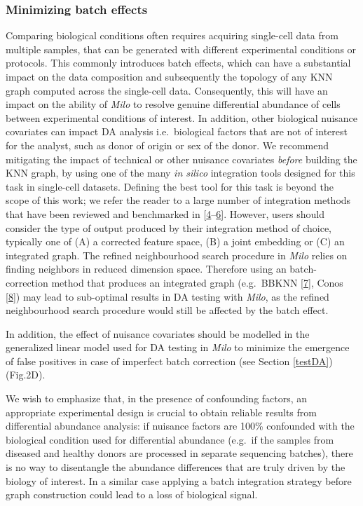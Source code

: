 \documentclass[
]{article}
\begin{document}
\hypertarget{minimizing-batch-effects}{%
\subsubsection{Minimizing batch effects}\label{minimizing-batch-effects}}

Comparing biological conditions often requires acquiring single-cell data from multiple samples, that can be generated with different experimental conditions or protocols. This commonly introduces batch effects, which can have a substantial impact on the data composition and subsequently the topology of any KNN graph computed across the single-cell data. Consequently, this will have an impact on the ability of \emph{Milo} to resolve genuine differential abundance of cells between experimental conditions of interest. In addition, other biological nuisance covariates can impact DA analysis i.e.~biological factors that are not of interest for the analyst, such as donor of origin or sex of the donor. We recommend mitigating the impact of technical or other nuisance covariates \emph{before} building the KNN graph, by using one of the many \emph{in silico} integration tools designed for this task in single-cell datasets.
Defining the best tool for this task is beyond the scope of this work; we refer the reader to a large number of integration methods that have been reviewed and benchmarked in {[}\protect\hyperlink{ref-lueckenBenchmarkingAtlaslevelData2020}{4}--\protect\hyperlink{ref-tranBenchmarkBatcheffectCorrection2020}{6}{]}. However, users should consider the type of output produced by their integration method of choice, typically one of (A) a corrected feature space, (B) a joint embedding or (C) an integrated graph. The refined neighbourhood search procedure in \emph{Milo} relies on finding neighbors in reduced dimension space. Therefore using an batch-correction method that produces an integrated graph (e.g.~BBKNN {[}\protect\hyperlink{ref-polanskiBBKNNFastBatch}{7}{]}, Conos {[}\protect\hyperlink{ref-barkasJointAnalysisHeterogeneous2019}{8}{]}) may lead to sub-optimal results in DA testing with \emph{Milo}, as the refined neighbourhood search procedure would still be affected by the batch effect.

In addition, the effect of nuisance covariates should be modelled in the generalized linear model used for DA testing in \emph{Milo} to minimize the emergence of false positives in case of imperfect batch correction (see Section \ref{testDA}) (Fig.2D).

We wish to emphasize that, in the presence of confounding factors, an appropriate experimental design is crucial to obtain reliable results from differential abundance analysis: if nuisance factors are 100\% confounded with the biological condition used for differential abundance (e.g.~if the samples from diseased and healthy donors are processed in separate sequencing batches), there is no way to disentangle the abundance differences that are truly driven by the biology of interest. In a similar case applying a batch integration strategy before graph construction could lead to a loss of biological signal.
\end{document}
